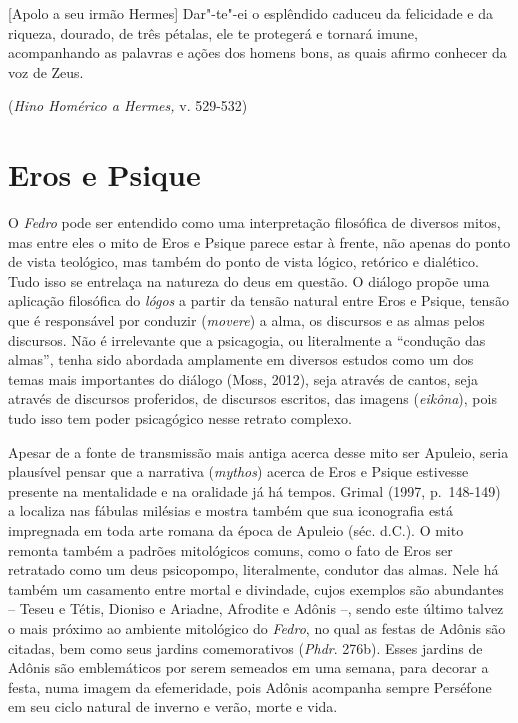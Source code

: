 
\epigraph{[Apolo a seu irmão Hermes] Dar"-te"-ei o esplêndido caduceu da felicidade e da riqueza, dourado, de
três pétalas, ele te protegerá e tornará imune, acompanhando as
palavras e ações dos homens bons, as quais afirmo conhecer da voz de
Zeus.}{(\emph{Hino Homérico a Hermes,} v. 529-532)} 


\section{Eros e Psique}
 

O \emph{Fedro} pode ser entendido como uma interpretação filosófica de
diversos mitos, mas entre eles o mito de Eros e Psique parece estar à
frente, não apenas do ponto de vista teológico, mas também do ponto de
vista lógico, retórico e dialético. Tudo isso se entrelaça na natureza
do deus em questão. O diálogo propõe uma aplicação filosófica
do \emph{lógos} a partir da tensão natural entre Eros e Psique, tensão
que é responsável por conduzir (\emph{movere}) a alma, os discursos e as almas
pelos discursos. Não é irrelevante que a psicagogia, ou
literalmente a ``condução das almas'', tenha sido abordada amplamente em
diversos estudos como um dos temas mais importantes do diálogo (Moss, 2012), seja através de cantos, seja através de discursos proferidos, de
discursos escritos, das imagens (\emph{eikôna}), pois tudo isso tem
poder psicagógico nesse retrato complexo.

Apesar de a fonte de transmissão mais antiga acerca desse mito ser
Apuleio, seria plausível pensar que a narrativa (\emph{mythos}) acerca de Eros e
Psique estivesse presente na mentalidade e na oralidade já há tempos.
Grimal (1997, p.~148-149) a localiza nas fábulas milésias e
mostra também que sua iconografia está impregnada em toda arte romana da
época de Apuleio (séc.  d.C.). O mito remonta também a padrões
mitológicos comuns, como o fato de Eros ser retratado como um deus psicopompo,
literalmente, condutor das almas. Nele há também um casamento entre
mortal e divindade, cujos exemplos são abundantes -- Teseu e Tétis,
Dioniso e Ariadne, Afrodite e Adônis --, sendo este último talvez o mais
próximo ao ambiente mitológico do \emph{Fedro}, no qual as festas de
Adônis são citadas, bem como seus jardins comemorativos
(\emph{Phdr}. 276b). Esses jardins de Adônis são emblemáticos por serem
semeados em uma semana, para decorar a festa, numa imagem da
efemeridade, pois Adônis acompanha sempre Perséfone em seu ciclo natural de
inverno e verão, morte e vida.

